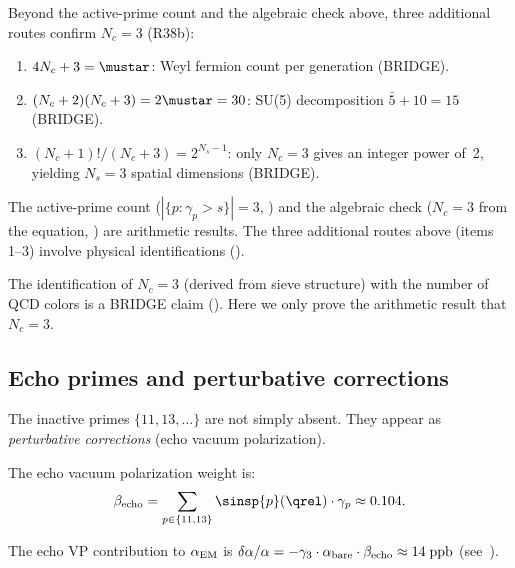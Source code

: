 \documentclass[12pt,a4paper]{article}
\begin{document}
\begin{remark}[Five independent routes to $N_c = 3$]
\label{rem:Nc_routes}
Beyond the active-prime count and the algebraic check above,
three additional routes confirm $N_c = 3$ (R38b):
\begin{enumerate}[nosep]
\item $4N_c + 3 = \mustar$: Weyl fermion count per generation (BRIDGE).
\item $(N_c + 2)(N_c + 3) = 2\mustar = 30$: SU(5) decomposition
  $\bar{5} + 10 = 15$ (BRIDGE).
\item $(N_c + 1)!/(N_c + 3) = 2^{N_s - 1}$: only $N_c = 3$ gives
  an integer power of~2, yielding $N_s = 3$ spatial dimensions (BRIDGE).
\end{enumerate}
The active-prime count ($|\{p : \gamma_p > s\}| = 3$, \THMTAG) and
the algebraic check ($N_c = 3$ from the equation, \THMTAG) are
arithmetic results.  The three additional routes above (items 1--3)
involve physical identifications (\BRIDGETAG).
\end{remark}

\begin{remark}
The identification of $N_c = 3$ (derived from sieve structure) with the
number of QCD colors is a BRIDGE claim (\cite{companion_M5}). Here we only prove
the arithmetic result that $N_c = 3$.
\end{remark}

\subsection{Echo primes and perturbative corrections}
\label{sec:ghost}

The inactive primes $\{11, 13, \ldots\}$ are not simply absent.
They appear as \emph{perturbative corrections} (echo vacuum polarization).

\begin{definition}
\label{def:ghost_vp}
The echo vacuum polarization weight is:
\begin{equation}
  \beta_{\rm echo} = \sum_{p \in \{11,13\}} \sinsp{p}(\qrel) \cdot \gamma_p
  \approx 0.104.
  \label{eq:ghost_vp:ch06}
\end{equation}
\end{definition}

The echo VP contribution to $\alpha_{\rm EM}$ is $\delta\alpha/\alpha
= -\gamma_3 \cdot \alpha_{\rm bare} \cdot \beta_{\rm echo} \approx 14\;{\rm ppb}$
(see~\cite{companion_physics}).
\end{document}
